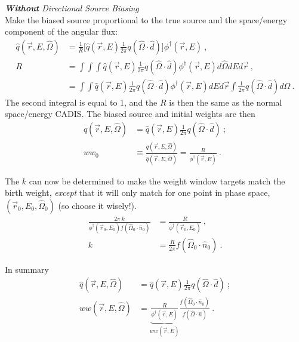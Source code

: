 \documentclass[12pt,twoside]{article}
\newcommand{\vOmega}{\ensuremath{\hat{\Omega}}}
\begin{document}
\vspace*{1em}
\noindent \textit{\textbf{Without} Directional Source Biasing}\\
Make the biased source proportional to the true source and the space/energy component of the angular flux:
\begin{align}
  \hat{q}(\vec{r}, E, \vOmega) &= \frac{1}{R} \bigl[\hat{q} (\vec{r}, E) \frac{1}{2 \pi} q(\vOmega \cdot \hat{d})\bigr]\phi^{\dagger}(\vec{r}, E)\:, \\
  R &= \int \int \int \hat{q} (\vec{r}, E) \frac{1}{2 \pi} q(\vOmega \cdot \hat{d})\phi^{\dagger}(\vec{r}, E) d\vOmega dE d\vec{r} \:,\\
  &= \int \int \hat{q} (\vec{r}, E) \frac{1}{2 \pi} q(\vOmega \cdot \hat{d})\phi^{\dagger}(\vec{r}, E) dE d\vec{r} \int \frac{1}{2 \pi} q(\vOmega \cdot \hat{d}) d\vOmega \:.
\end{align}
The second integral is equal to 1, and the $R$ is then the same as the normal space/energy CADIS. The biased source and initial weights are then
\begin{align}
  \hat{q}(\vec{r}, E, \vOmega) &= \hat{q} (\vec{r}, E) \frac{1}{2 \pi} q(\vOmega \cdot \hat{d})\:; \\
  ww_0 &\equiv \frac{q(\vec{r}, E, \vOmega)}{\hat{q}(\vec{r}, E, \vOmega)} = \frac{R}{\phi^{\dagger}(\vec{r}, E)} \:.
\end{align}

The $k$ can now be determined to make the weight window targets match the birth weight, \emph{except} that it will only match for one point in phase space, $(\vec{r}_0, E_0, \vOmega_0)$ (so choose it wisely!). 
\begin{align}
  \frac{2\pi \:k}{\phi^{\dagger}(\vec{r}_0, E_0) f(\vOmega_0 \cdot \hat{n}_0)} &= \frac{R}{\phi^{\dagger}(\vec{r}_0, E_0)} \:, \\
  k &= \frac{R}{2\pi}f(\vOmega_0 \cdot \hat{n}_0) \:.
\end{align}

In summary
\begin{align}
  \hat{q}(\vec{r}, E, \vOmega) &= \hat{q} (\vec{r}, E) \frac{1}{2 \pi} q(\vOmega \cdot \hat{d}) \:; \\
  ww(\vec{r}, E, \vOmega) &= \underbrace{\frac{R}{\phi^{\dagger}(\vec{r}, E)}}_{ww(\vec{r},E)} \frac{f(\vOmega_0 \cdot \hat{n}_0)}{f(\vOmega \cdot \hat{n})} \:.
\end{align}
\end{document}
